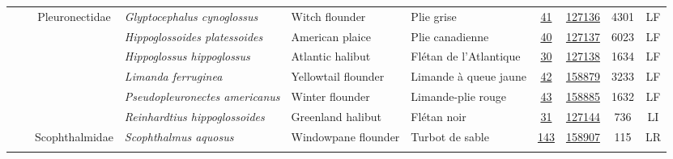 \documentclass[12pt]{article}\usepackage[]{graphicx}\usepackage[]{color}
\begin{document}
\begin{landscapepage}
\begin{longtable}[t]{ccc>{\centering\arraybackslash}p{3cm}>{\centering\arraybackslash}p{3cm}>{\centering\arraybackslash}p{3cm}>{}c>{}ccc}
\hspace{1em}\hspace{1em} &  & Pleuronectidae & \em{Glyptocephalus cynoglossus} & Witch flounder & Plie grise & \href{#sec:41}{41} & \href{http://www.marinespecies.org/aphia.php?p=taxdetails&id=127136}{127136} & 4301 & LF\\
\hspace{1em}\hspace{1em} &  &  & \em{Hippoglossoides platessoides} & American plaice & Plie canadienne & \href{#sec:40}{40} & \href{http://www.marinespecies.org/aphia.php?p=taxdetails&id=127137}{127137} & 6023 & LF\\
\hspace{1em}\hspace{1em} &  &  & \em{Hippoglossus hippoglossus} & Atlantic halibut & Flétan de l'Atlantique & \href{#sec:30}{30} & \href{http://www.marinespecies.org/aphia.php?p=taxdetails&id=127138}{127138} & 1634 & LF\\
\hspace{1em}\hspace{1em} &  &  & \em{Limanda ferruginea} & Yellowtail flounder & Limande à queue jaune & \href{#sec:42}{42} & \href{http://www.marinespecies.org/aphia.php?p=taxdetails&id=158879}{158879} & 3233 & LF\\
\hspace{1em}\hspace{1em} &  &  & \em{Pseudopleuronectes americanus} & Winter flounder & Limande-plie rouge & \href{#sec:43}{43} & \href{http://www.marinespecies.org/aphia.php?p=taxdetails&id=158885}{158885} & 1632 & LF\\
\hspace{1em}\hspace{1em} &  &  & \em{Reinhardtius hippoglossoides} & Greenland halibut & Flétan noir & \href{#sec:31}{31} & \href{http://www.marinespecies.org/aphia.php?p=taxdetails&id=127144}{127144} & 736 & LI\\
\hspace{1em}\hspace{1em} &  & Scophthalmidae & \em{Scophthalmus aquosus} & Windowpane flounder & Turbot de sable & \href{#sec:143}{143} & \href{http://www.marinespecies.org/aphia.php?p=taxdetails&id=158907}{158907} & 115 & LR\\
\addlinespace[0.3em]
\\

\end{longtable}
\end{landscapepage}
\end{document}
